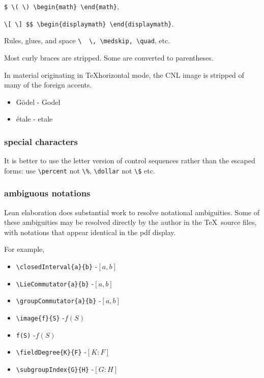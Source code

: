 \documentclass[12pt]{amsart}
\begin{document}
\verb!$ \( \) \begin{math} \end{math}!, 

\verb!\[ \] $$ \begin{displaymath} \end{displaymath}!.

Rules, glues, and space \verb!\  \, \medskip, \quad!, etc.

Most curly braces are stripped.  Some are converted to
parentheses.


In material originating in \TeX horizontal mode, 
the CNL image is
stripped of many of the foreign accents.

\begin{itemize}
\item G\"odel - Godel
\item \'etale - etale
\end{itemize}




\subsubsection{special characters}

It is better to use the letter version of control
sequences rather than the escaped forms:
use \verb!\percent! not \verb!\%!, \verb!\dollar! not
\verb!\$! etc.

\subsubsection{ambiguous notations}

Lean elaboration does substantial work to resolve
notational ambiguities.  Some of these ambiguities
may be resolved directly by the author in the
\TeX\ source files, with notations that appear identical
in the pdf display.

For example,
\begin{itemize}
\item \verb!\closedInterval{a}{b}! -\qquad $[a,b]$
\item \verb!\LieCommutator{a}{b}! -\qquad $[a,b]$
\item \verb!\groupCommutator{a}{b}! -\qquad $[a,b]$
\item \verb!\image{f}{S}! -\qquad $f(S)$
\item \verb!f(S)! -\qquad $f(S)$
\item \verb!\fieldDegree{K}{F}! -\qquad $[K:F]$
\item \verb!\subgroupIndex{G}{H}! -\qquad $[G:H]$
\end{itemize}
\end{document}
